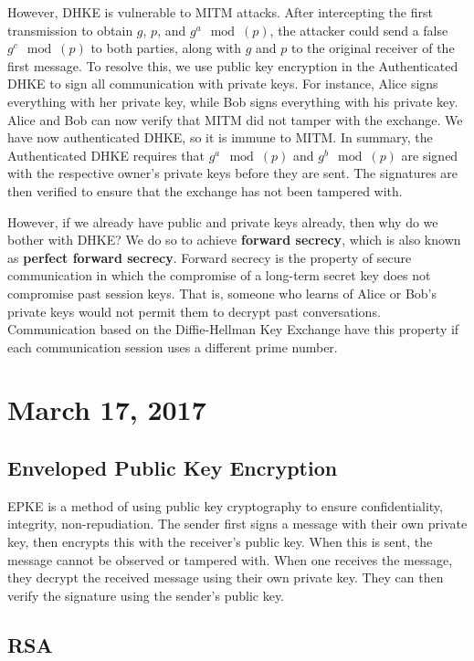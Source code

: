 \documentclass[11pt]{article}
\theoremstyle{plain} %
\theoremstyle{definition}
\theoremstyle{example}
\theoremstyle{remark}
\begin{document}
However, DHKE is vulnerable to MITM attacks. After intercepting the first transmission to obtain $g$, $p$, and $g^a\mod(p)$, the attacker could send a false $g^c\mod(p)$ to both parties, along with $g$ and $p$ to the original receiver of the first message. To resolve this, we use public key encryption in the Authenticated DHKE to sign all communication with private keys. For instance, Alice signs everything with her private key, while Bob signs everything with his private key. Alice and Bob can now verify that MITM did not tamper with the exchange. We have now authenticated DHKE, so it is immune to MITM. In summary, the Authenticated DHKE requires that $g^a\mod(p)$ and $g^b\mod(p)$ are signed with the respective owner's private keys before they are sent. The signatures are then verified to ensure that the exchange has not been tampered with. 

However, if we already have public and private keys already, then why do we bother with DHKE? We do so to achieve \textbf{forward secrecy}, which is also known as \textbf{perfect forward secrecy}. Forward secrecy is the property of secure communication in which the compromise of a long-term secret key does not compromise past session keys. That is, someone who learns of Alice or Bob's private keys would not permit them to decrypt past conversations. Communication based on the Diffie-Hellman Key Exchange have this property if each communication session uses a different prime number. 


\section{March 17, 2017}
\subsection{Enveloped Public Key Encryption}

EPKE is a method of using public key cryptography to ensure confidentiality, integrity, non-repudiation. The sender first signs a message with their own private key, then encrypts this with the receiver's public key. When this is sent, the message cannot be observed or tampered with. When one receives the message, they decrypt the received message using their own private key. They can then verify the signature using the sender's public key. 

\subsection{RSA}
\end{document}
